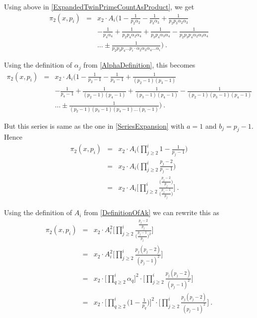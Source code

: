\documentclass{article}
\numberwithin{equation}{section}
\begin{document}
Using above in \eqref{ExpandedTwinPrimeCountAsProduct}, we get
\begin{eqnarray} \nonumber
\pi_2(x,p_i) &=& x_2 \cdot A_i \Big( 1 - \frac{1}{p_2 \alpha_2} - \frac{1}{p_3 \alpha_3} + \frac{1}{p_2 p_3 \alpha_2 \alpha_3} 
\nonumber\\
{} & & - \frac{1}{p_4 \alpha_4} + \frac{1}{p_2 p_4 \alpha_2 \alpha_4} + \frac{1}{p_3 p_4 \alpha_3 \alpha_4}
- \frac{1}{p_2 p_3 p_4 \alpha_2 \alpha_3 \alpha_4} 
\nonumber\\
{} & & \ldots \pm \frac{1}{p_2 p_3 p_4 \ldots p_i \cdot \alpha_2 \alpha_3 \alpha_4 \ldots \alpha_i}
\Big) ~ \nonumber .
\end{eqnarray}

Using the definition of $\alpha_j$ from \eqref{AlphaDefinition}, this becomes
\begin{eqnarray} \nonumber
\pi_2(x,p_i) &=& x_2 \cdot A_i \Big( 1 - \frac{1}{p_2 - 1} - \frac{1}{p_3 - 1} + \frac{1}{(p_2-1)(p_3-1)} 
\nonumber\\
{} & & - \frac{1}{p_4-1} + \frac{1}{(p_2-1)(p_4-1)} + \frac{1}{(p_3-1)(p_4-1)}
- \frac{1}{(p_2-1)(p_3-1)(p_4-1)}
\nonumber\\
{} & & \ldots \pm \frac{1}{(p_2-1)(p_3-1)(p_4-1)\ldots (p_i-1)}
\Big) ~ \nonumber .
\end{eqnarray}

But this series is same as the one in \eqref{SeriesExpansion} with $a=1$ and $b_j=p_j-1$. Hence
\begin{eqnarray} \nonumber
\pi_2(x,p_i) &=& x_2 \cdot A_i \Big(\prod\limits_{j \ge 2}^i{1 - \frac{1}{p_j - 1}}
\Big)
\nonumber\\
&=& x_2 \cdot A_i \Big(\prod\limits_{j \ge 2}^i{\frac{p_j - 2}{p_j - 1}}\Big)
\nonumber\\
&=& x_2 \cdot A_i \Bigg[\prod\limits_{j \ge 2}^i{\frac{\Big(\frac{p_j - 2}{p_j}\Big)}{\Big(\frac{p_j - 1}{p_j}\Big)}}
\Bigg] \nonumber ~ .
\end{eqnarray}

Using the definition of $A_i$ from \eqref{DefinitionOfAk} we can rewrite this as
\begin{eqnarray} \nonumber
\pi_2(x,p_i) &=& x_2 \cdot A_i^2 \Bigg[\prod\limits_{j \ge 2}^i{\frac{\frac{p_j - 2}{p_j}}{\Big(\frac{p_j - 1}{p_j}\Big)^2}}\Bigg]
\nonumber\\
&=& x_2 \cdot A_i^2 \Big[\prod\limits_{j \ge 2}^i{\frac{p_j (p_j - 2)}{(p_j - 1)^2}}\Big]
\nonumber\\
&=& x_2 \cdot \Big[\prod\limits_{q \ge 2}^i{\alpha_q}\Big]^2 \cdot \Big[\prod\limits_{j \ge 2}^i{\frac{p_j (p_j - 2)}{(p_j - 1)^2}}\Big]
\nonumber\\
&=& x_2 \cdot \Big[\prod\limits_{q \ge 2}^i{\Big(1 - \frac{1}{p_q} \Big)}\Big]^2 \cdot \Big[\prod\limits_{j \ge 2}^i{\frac{p_j (p_j - 2)}{(p_j - 1)^2}}\Big] \nonumber  ~ .
\end{eqnarray}
\end{document}
